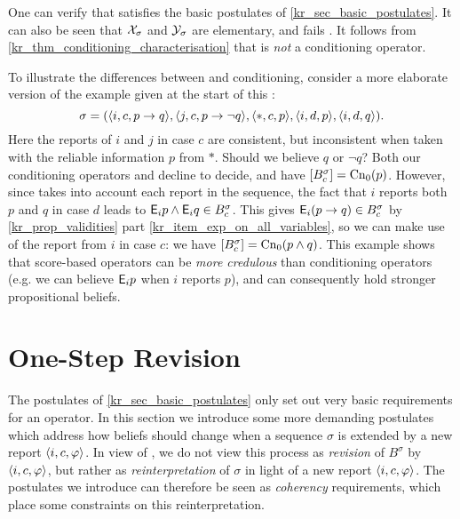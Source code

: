 One can verify that \scorebasedop{} satisfies the basic postulates of
\cref{kr_sec_basic_postulates}. It can also be seen that $\mathcal{X}_\sigma$ and
$\mathcal{Y}_\sigma$ are elementary, and \scorebasedop{} fails \incvac{}.
It follows from
\cref{kr_thm_conditioning_characterisation} that \scorebasedop{} is \emph{not} a
conditioning operator.\footnotemark{}


\begin{example}
\label{kr_ex_score_based}
     To illustrate the differences between \scorebasedop{} and conditioning,
     consider a more elaborate version of the
     example given at the start of this :
     \[
        \sigma = (
            \langle {i, c, p \to q} \rangle,
            \langle {j, c, p \to\neg q} \rangle,
            \langle {\ast, c, p} \rangle,
            \langle {i, d, p} \rangle,
            \langle {i, d, q} \rangle
        ).
     \]
     Here the reports of $i$ and $j$ in case $c$ are consistent,
     but inconsistent when taken with
     the reliable information $p$ from $\ast$. Should we believe $q$ or $\neg
     q$? Both our conditioning operators \varbasedcond{} and \partbasedcond{}
     decline to decide, and have $\left[{B^\sigma_c}\right] = \operatorname{Cn}_0(p)$. However,
     since \scorebasedop{} takes into account each report in the
     sequence, the fact that $i$ reports both $p$ and $q$ in case $d$ leads to
     $\mathsf{E}_i{p} \land \mathsf{E}_i{q} \in B^\sigma_c$. This gives $\mathsf{E}_i(p \to q)
     \in B^\sigma_c$ by \cref{kr_prop_validities} part
     \cref{kr_item_exp_on_all_variables}, so we can make use of the report
     from $i$ in case $c$: we have $\left[{B^\sigma_c}\right] = \operatorname{Cn}_0(p \land
     q)$.
     This example shows that score-based operators can be \emph{more credulous}
     than conditioning operators (e.g. we can believe $\mathsf{E}_i{p}$ when
     $i$ reports $p$), and can consequently hold stronger propositional
     beliefs.

\end{example}

\section{One-Step Revision}
\label{kr_sec_one_step_postulates}

The postulates of \cref{kr_sec_basic_postulates} only set out very basic
requirements for an operator. In this section we introduce some more demanding
postulates which address how beliefs should change when a sequence $\sigma$ is
extended by a new report $\langle {i, c, \varphi} \rangle$.  In view of \rearr{}, we do not
view this process as \emph{revision} of $B^\sigma$ by $\langle {i, c, \varphi} \rangle$, but
rather as \emph{reinterpretation} of $\sigma$ in light of a new report
$\langle {i, c, \varphi} \rangle$. The postulates we introduce can therefore be seen as
\emph{coherency} requirements, which place some constraints on this
reinterpretation.


